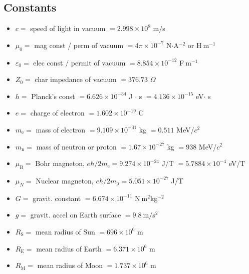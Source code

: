 \documentclass[letterpaper,landscape,10pt]{article}
\newenvironment{myitemize}
{\begin{itemize}
	\setlength{\itemsep}{0pt}
	\setlength{\parskip}{0pt}
	\setlength{\parsep}{0pt}}
{\end{itemize}}
\begin{document}
{\begin{multicols}{4}
\section*{Constants}
	\begin{myitemize}
		\item[$c = $] 
		  speed of light in vacuum $ = 2.998\times 10^8$ m$/$s
		\item[$\mu_0 = $]
			mag const / perm of vacuum $ = 4 \pi \times 10^{-7}$
			N$\cdot$A$^{-2}$ or H$\>$m$^{-1}$
		\item[$\varepsilon_0 = $]
			elec const / permit of vacuum $ = 8.854 \times 10^{-12}$
			F$\>$m$^{-1}$
		\item[$Z_0 = $]
			char impedance of vacuum $ = 376.73$ $\Omega$
		\item[$h = $]
		  Planck's const $ = 6.626 \times 10^{-34}$ J $\cdot$ s
		  $ = 4.136 \times 10^{-15}$ eV$\cdot$ s

		\vspace{4pt}

		\item[$e = $]
		  charge of electron  $ = 1.602\times10^{-19}$ C
		\item[$m_\mathrm{e} = $]
		  mass of electron $ = 9.109\times10^{-31}$ kg $ = 0.511$ MeV/$c^2$
		\item[$m_\mathrm{n} = $]
		  mass of neutron or proton $ = 1.67\times10^{-27}$ kg
		  $ = 938$ MeV/$c^2$
		\item[$\mu_\mathrm{B} = $]
		  Bohr magneton, $e\hbar/2m_\mathrm{e} = 9.274\times10^{-24}$ J/T
		  $ = 5.7884\times10^{-4}$ eV/T
		\item[$\mu_N = $]
		  Nuclear magneton, $e\hbar/2m_\mathrm{p} = 5.051\times10^{-27}$ J/T

		\vspace{4pt}

		\item[$G = $]
		  gravit. constant $ = 6.674\times10^{-11}$ N$\>$m$^2$kg$^{-2}$
		\item[$g = $]
		  gravit. accel on Earth surface $ = 9.8 \>$m$/$s$^{2}$

		\vspace{4pt}

	  	\item[$R_\mathrm{S} = $]
		  mean radius of Sun $ = 696\times10^{6}$ m
		\item[$R_\mathrm{E} = $]
		  mean radius of Earth $ = 6.371\times10^{6}$ m
		\item[$R_\mathrm{M} = $]
		  mean radius of Moon $ = 1.737\times10^{6}$ m


\end{myitemize}
\end{multicols}}
\end{document}
